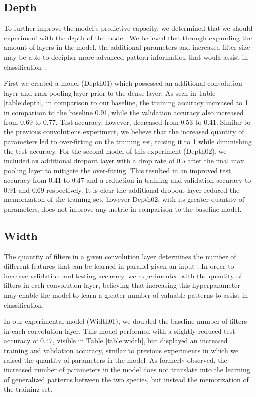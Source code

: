 \documentclass{article}
\begin{document}
\subsection{Depth}

To further improve the model's predictive capacity, we determined that we should experiment with the depth of the model. We believed that through expanding the amount of layers in the model, the additional parameters and increased filter size may be able to decipher more advanced pattern information that would assist in classification \cite{Goodfellow-et-al-2016}.

First we created a model (Depth01) which possessed an additional convolution layer and max pooling layer prior to the dense layer. As seen in Table \ref{table:depth}, in comparison to our baseline, the training accuracy increased to 1 in comparison to the baseline 0.91, while the validation accuracy also increased from 0.69 to 0.77. Test accuracy, however, decreased from 0.53 to 0.41. Similar to the previous convolutions experiment, we believe that the increased quantity of parameters led to over-fitting on the training set, raising it to 1 while diminishing the test accuracy. For the second model of this experiment (Depth02), we included an additional dropout layer with a drop rate of 0.5 after the final max pooling layer to mitigate the over-fitting. This resulted in an improved test accuracy from 0.41 to 0.47 and a reduction in training and validation accuracy to 0.91 and 0.69 respectively. It is clear the additional dropout layer reduced the memorization of the training set, however Depth02, with its greater quantity of parameters, does not improve any metric in comparison to the baseline model.

\subsection{Width}

The quantity of filters in a given convolution layer determines the number of different features that can be learned in parallel given an input \cite{inproceedings}. In order to increase validation and testing accuracy, we experimented with the quantity of filters in each convolution layer, believing that increasing this hyperparameter may enable the model to learn a greater number of valuable patterns to assist in classification.

In our experimental model (Width01), we doubled the baseline number of filters in each convolution layer. This model performed with a slightly reduced test accuracy of 0.47, visible in Table \ref{table:width}, but displayed an increased training and validation accuracy, similar to previous experiments in which we raised the quantity of parameters in the model. As formerly observed, the increased number of parameters in the model does not translate into the learning of generalized patterns between the two species, but instead the memorization of the training set.
\end{document}
